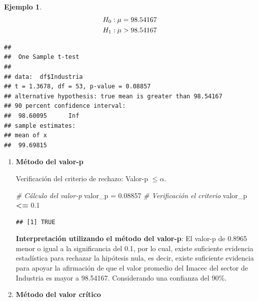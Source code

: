 \documentclass[
  11pt,
]{book}
\newenvironment{Shaded}{\begin{snugshade}}{\end{snugshade}}
\newcommand{\AttributeTok}[1]{\textcolor[rgb]{0.13,0.29,0.53}{#1}}
\newcommand{\CommentTok}[1]{\textcolor[rgb]{0.56,0.35,0.01}{\textit{#1}}}
\newcommand{\FloatTok}[1]{\textcolor[rgb]{0.00,0.00,0.81}{#1}}
\newcommand{\FunctionTok}[1]{\textcolor[rgb]{0.13,0.29,0.53}{\textbf{#1}}}
\newcommand{\NormalTok}[1]{#1}
\newcommand{\OtherTok}[1]{\textcolor[rgb]{0.56,0.35,0.01}{#1}}
\newcommand{\SpecialCharTok}[1]{\textcolor[rgb]{0.81,0.36,0.00}{\textbf{#1}}}
\newcommand{\StringTok}[1]{\textcolor[rgb]{0.31,0.60,0.02}{#1}}
\theoremstyle{definition}
\theoremstyle{definition}
\newtheorem{example}{Ejemplo}[chapter]
\theoremstyle{definition}
\theoremstyle{definition}
\theoremstyle{remark}
\begin{document}
\begin{example}
\begin{equation}
    \notag
    \begin{split}
        H_0: \mu = 98.54167\\
        H_1: \mu > 98.54167
    \end{split}
\end{equation}

\begin{Shaded}
\end{Shaded}

\begin{verbatim}
## 
##  One Sample t-test
## 
## data:  df$Industria
## t = 1.3678, df = 53, p-value = 0.08857
## alternative hypothesis: true mean is greater than 98.54167
## 90 percent confidence interval:
##  98.60095      Inf
## sample estimates:
## mean of x 
##  99.69815
\end{verbatim}

\begin{enumerate}
\def\labelenumi{\arabic{enumi}.}
\item
  \textbf{Método del valor-p}

  Verificación del criterio de rechazo: Valor-p \(\leq \alpha\).

\begin{Shaded}
\begin{Highlighting}[]
\CommentTok{\# Cálculo del valor{-}p}
\NormalTok{valor\_p }\OtherTok{=} \FloatTok{0.08857}
\CommentTok{\# Verificación el criterio}
\NormalTok{valor\_p }\SpecialCharTok{\textless{}=} \FloatTok{0.1}
\end{Highlighting}
\end{Shaded}

\begin{verbatim}
## [1] TRUE
\end{verbatim}

  \textbf{Interpretación utilizando el método del valor-p}: El valor-p de 0.8965 menor o igual a la significancia del 0.1, por lo cual, existe suficiente evidencia estadística para rechazar la hipótesis nula, es decir, existe suficiente evidencia para apoyar la afirmación de que el valor promedio del Imacec del sector de Industria es mayor a 98.54167. Considerando una confianza del 90\%.
\item
  \textbf{Método del valor crítico}


\end{enumerate}
\end{example}
\end{document}
